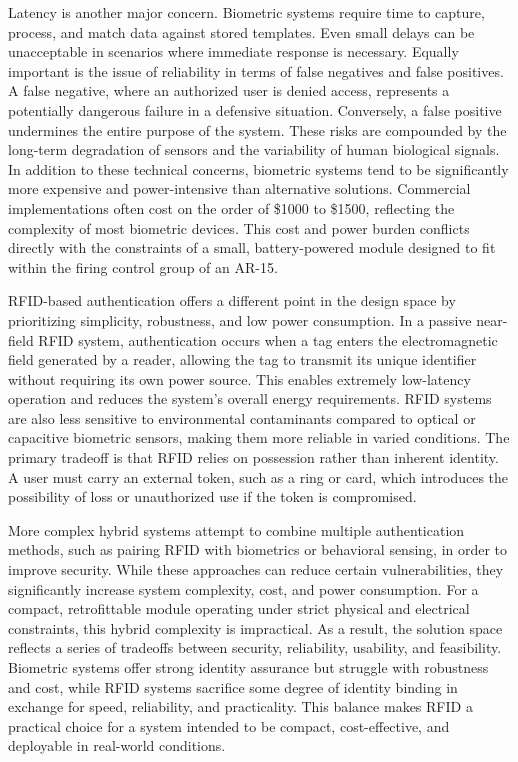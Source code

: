 Latency is another major concern. Biometric systems require time to capture, process, and match data against stored templates. 
Even small delays can be unacceptable in scenarios where immediate response is necessary. Equally important is the issue of 
reliability in terms of false negatives and false positives. A false negative, where an authorized user is denied access, represents
a potentially dangerous failure in a defensive situation. Conversely, a false positive undermines the entire purpose of the
system. These risks are compounded by the long-term degradation of sensors and the variability of human biological signals. In 
addition to these technical concerns, biometric systems tend to be significantly more expensive and power-intensive than 
alternative solutions. Commercial implementations often cost on the order of \$1000 to \$1500, reflecting the complexity of 
most biometric devices. This cost and power burden conflicts directly with the constraints of a small, battery-powered module designed 
to fit within the firing control group of an AR-15.

RFID-based authentication offers a different point in the design space by prioritizing simplicity, robustness, and low power 
consumption. In a passive near-field RFID system, authentication occurs when a tag enters the electromagnetic field generated 
by a reader, allowing the tag to transmit its unique identifier without requiring its own power source. This enables extremely 
low-latency operation and reduces the system's overall energy requirements. RFID systems are also less sensitive to environmental 
contaminants compared to optical or capacitive biometric sensors, making them more reliable in varied conditions. The primary 
tradeoff is that RFID relies on possession rather than inherent identity. A user must carry an external token, such as a ring or 
card, which introduces the possibility of loss or unauthorized use if the token is compromised.

More complex hybrid systems attempt to combine multiple authentication methods, such as pairing RFID with biometrics or behavioral 
sensing, in order to improve security. While these approaches can reduce certain vulnerabilities, they significantly increase system 
complexity, cost, and power consumption. For a compact, retrofittable module operating under strict physical and electrical 
constraints, this hybrid complexity is impractical. As a result, the solution space reflects a series of tradeoffs between security, 
reliability, usability, and feasibility. Biometric systems offer strong identity assurance but struggle with robustness and cost, 
while RFID systems sacrifice some degree of identity binding in exchange for speed, reliability, and practicality. This balance 
makes RFID a practical choice for a system intended to be compact, cost-effective, and deployable in real-world conditions.